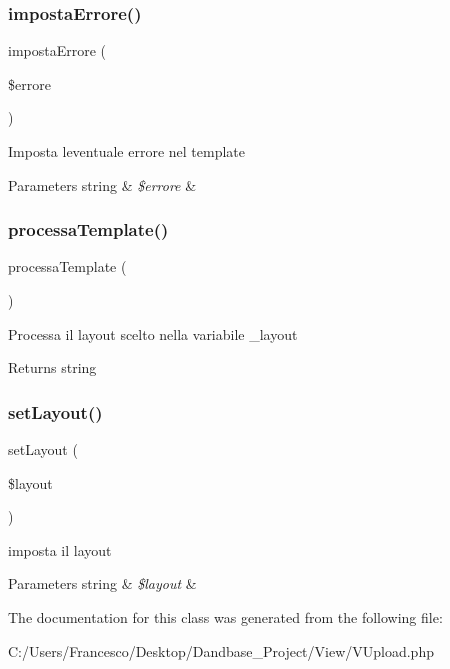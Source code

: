 \subsubsection{\texorpdfstring{imposta\+Errore()}{impostaErrore()}}
{\footnotesize\ttfamily imposta\+Errore (\begin{DoxyParamCaption}\item[{}]{\$errore }\end{DoxyParamCaption})}

Imposta l\textquotesingle{}eventuale errore nel template


\begin{DoxyParams}[1]{Parameters}
string & {\em \$errore} & \\
\hline
\end{DoxyParams}
\mbox{\label{class_v_upload_a64bdc484fc7074989b4b2c0ebc63aec2}} 
\subsubsection{\texorpdfstring{processa\+Template()}{processaTemplate()}}
{\footnotesize\ttfamily processa\+Template (\begin{DoxyParamCaption}{ }\end{DoxyParamCaption})}

Processa il layout scelto nella variabile \+\_\+layout

\begin{DoxyReturn}{Returns}
string 
\end{DoxyReturn}
\mbox{\label{class_v_upload_a702b3376618a26e6c02c05bae65c6b9e}} 
\subsubsection{\texorpdfstring{set\+Layout()}{setLayout()}}
{\footnotesize\ttfamily set\+Layout (\begin{DoxyParamCaption}\item[{}]{\$layout }\end{DoxyParamCaption})}

imposta il layout


\begin{DoxyParams}[1]{Parameters}
string & {\em \$layout} & \\
\hline
\end{DoxyParams}


The documentation for this class was generated from the following file\+:\begin{DoxyCompactItemize}
\item 
C\+:/\+Users/\+Francesco/\+Desktop/\+Dandbase\+\_\+\+Project/\+View/V\+Upload.\+php\end{DoxyCompactItemize}
